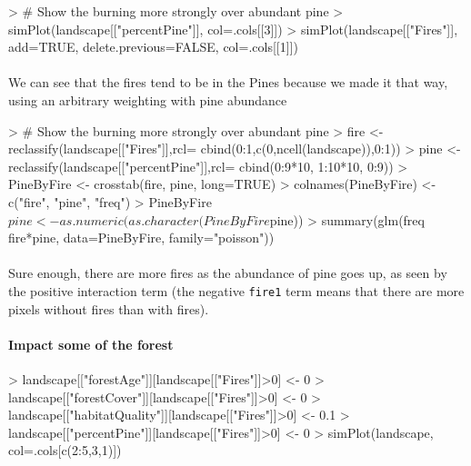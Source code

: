 \documentclass{article}
\begin{document}
\begin{Schunk}
\begin{Sinput}
> # Show the burning more strongly over abundant pine
> simPlot(landscape[["percentPine"]], col=.cols[[3]])
> simPlot(landscape[["Fires"]], add=TRUE, delete.previous=FALSE, col=.cols[[1]])
\end{Sinput}
\end{Schunk}


\paragraph{}
We can see that the fires tend to be in the Pines because we made it that way, using an arbitrary weighting with pine abundance

\begin{Schunk}
\begin{Sinput}
> # Show the burning more strongly over abundant pine
> fire <- reclassify(landscape[["Fires"]],rcl= cbind(0:1,c(0,ncell(landscape)),0:1))
> pine <- reclassify(landscape[["percentPine"]],rcl= cbind(0:9*10, 1:10*10, 0:9))
> PineByFire <- crosstab(fire, pine, long=TRUE)
> colnames(PineByFire) <- c("fire", "pine", "freq")
> PineByFire$pine <- as.numeric(as.character(PineByFire$pine))
> summary(glm(freq ~ fire*pine, data=PineByFire, family="poisson"))
\end{Sinput}
\end{Schunk}

\paragraph{}
Sure enough, there are more fires as the abundance of pine goes up, as seen by the positive interaction term (the negative \texttt{fire1} term means that there are more pixels without fires than with fires).

\paragraph{Impact some of the forest}
\begin{Schunk}
\begin{Sinput}
> landscape[["forestAge"]][landscape[["Fires"]]>0] <- 0
> landscape[["forestCover"]][landscape[["Fires"]]>0] <- 0
> landscape[["habitatQuality"]][landscape[["Fires"]]>0] <- 0.1
> landscape[["percentPine"]][landscape[["Fires"]]>0] <- 0
> simPlot(landscape, col=.cols[c(2:5,3,1)])
\end{Sinput}
\end{Schunk}
\end{document}
